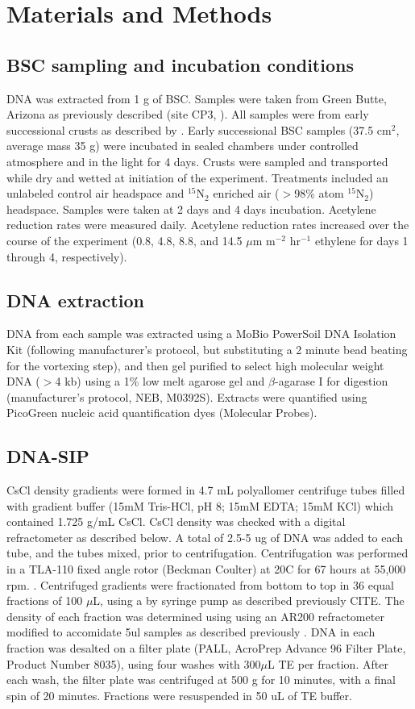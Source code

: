 \section{Materials and Methods}
\subsection{BSC sampling and incubation conditions}
DNA was extracted from 1 g of BSC. Samples were taken from Green Butte, Arizona
as previously described (site CP3, \citet{BERALDI_CAMPESI_2009}). All samples
were from early successional crusts as described by \cite{15643930}.  Early
successional BSC samples (37.5 cm$^{2}$, average mass 35 g) were incubated in
sealed chambers under controlled atmosphere and in the light for 4 days. Crusts
were sampled and transported while dry and wetted at initiation of the
experiment. Treatments included an unlabeled control air headspace and
$^{15}$N$_{2}$ enriched air ($>$98\% atom $^{15}$N$_{2}$) headspace. Samples
were taken at 2 days and 4 days incubation. Acetylene reduction rates were
measured daily. Acetylene reduction rates increased over the course of the
experiment (0.8, 4.8, 8.8, and 14.5 $\mu$m m$^{-2}$ hr$^{-1}$ ethylene for days
1 through 4, respectively). 

\subsection{DNA extraction}
DNA from each sample was extracted using a MoBio PowerSoil DNA Isolation Kit
(following manufacturer’s protocol, but substituting a 2 minute bead beating
for the vortexing step), and then gel purified to select high molecular 
weight DNA ($>$4 kb) using a 1\% low melt agarose gel and $\beta$-agarase I for
digestion (manufacturer's protocol, NEB, M0392S).  Extracts were quantified using
PicoGreen nucleic acid quantification dyes (Molecular Probes).

\subsection{DNA-SIP} CsCl density gradients were formed in 4.7 mL polyallomer
centrifuge tubes filled with gradient buffer (15mM Tris-HCl, pH 8; 15mM EDTA;
15mM KCl) which contained 1.725 g/mL CsCl. CsCl density was checked with a
digital refractometer as described below. A total of 2.5-5 ug of DNA was added
to each tube, and the tubes mixed, prior to centrifugation. Centrifugation was
performed in a TLA-110 fixed angle rotor (Beckman Coulter) at 20C for 67 hours
at 55,000 rpm. \citep{17369332}. Centrifuged gradients were fractionated from
bottom to top in 36 equal fractions of 100 $\mu$L, using a by syringe pump as
described previously CITE. The density of each fraction was determined
using using an AR200 refractometer modified to accomidate 5ul samples as 
described previously \citep{17369332}. DNA in each fraction was desalted on a
filter plate (PALL, AcroPrep Advance 96 Filter Plate, Product Number 8035),
using four washes with 300$\mu$L TE per fraction. After each wash, the filter
plate was centrifuged at 500 g for 10 minutes, with a final spin of 20 minutes.
Fractions were resuspended in 50 uL of TE buffer.


